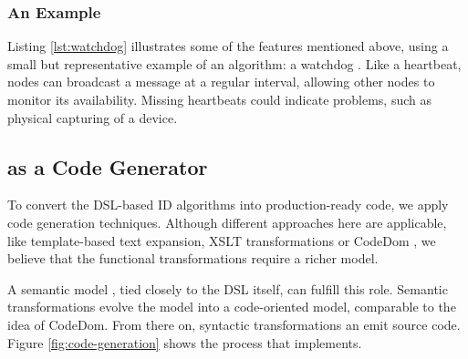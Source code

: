 \documentclass[conference]{IEEEtran}
\begin{document}
\subsubsection{An Example}

Listing \ref{lst:watchdog} illustrates some of the features mentioned above,
using a small but representative example of an algorithm: a
watchdog \cite{mishra2004intrusion}. Like a heartbeat, nodes can broadcast a
message at a regular interval, allowing other nodes to monitor its
availability. Missing heartbeats could indicate problems, such as physical
capturing of a device.



\subsection{\NAME as a Code Generator}
\label{code-generator-design}

To convert the DSL-based ID algorithms into production-ready code, we apply
code generation techniques. Although different approaches here are applicable,
like template-based text expansion, XSLT transformations or CodeDom
\cite{dollard2004code}, we believe that the functional transformations require
a richer model.

A semantic model \cite{fowler2010domain}, tied closely to the DSL itself, can
fulfill this role. Semantic transformations evolve the model into a
code-oriented model, comparable to the idea of CodeDom. From there on,
syntactic transformations an emit source code. Figure \ref{fig:code-generation}
shows the process that \NAME implements.
\end{document}
